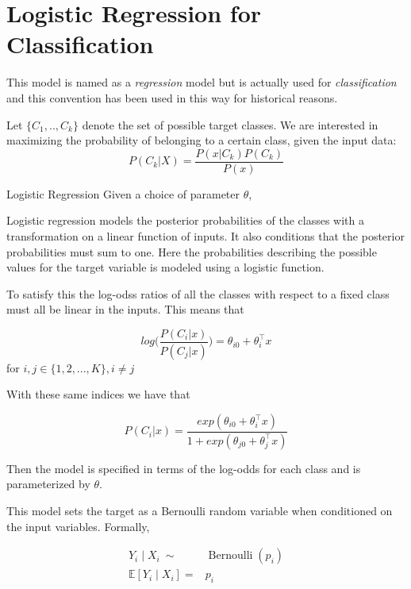 \section{Logistic Regression for Classification}\label{section-logisticRegression}

This model is named as a \textit{regression} model but is actually used for \textit{classification} and this convention has been used in this way for historical reasons.



Let $\{C_1,..,C_k\}$ denote the set of possible target classes. We are  interested in maximizing the probability of belonging to a certain class, given the input data:
$$P(C_k| X) = \frac{P(x|C_k)P(C_k)}{P(x)} $$

\begin{definition}{Logistic Regression}
	Given a choice of parameter $\theta$, 	
\end{definition}

Logistic regression models the posterior probabilities of the classes with a transformation on a linear function of inputs. It also conditions that the posterior probabilities must sum to one. Here the probabilities describing the possible values for the target variable is modeled using a logistic function.

To satisfy this the log-odss ratios of all the classes with respect to a fixed class must all be linear in the inputs. This means that

$$ log\big( \frac{P(C_i|x)}{P(C_j|x)}\big) = \theta_{i0}  + \theta_i^\intercal x  $$ for $i,j \in \{1,2,...,K\}, i\neq j$ \label{logit-logOddss}

With these same indices we have that

$$ P(C_i|x) = \frac{ exp(\theta_{i0}  + \theta_i^\intercal x)}{1 + exp(\theta_{j0}  + \theta_j^\intercal x)}   $$ 

Then the model is specified in terms of the log-odds for each class and is parameterized by $\theta$.

This model sets the target as a Bernoulli random variable when conditioned on the input variables. Formally,

\begin{equation}
\begin{split}
Y_i \mid X_i \  \sim & \operatorname{Bernoulli}(p_i) \\
\mathbb{E}[Y_i \mid X_i ] = & p_i  
\end{split}
\end{equation}


